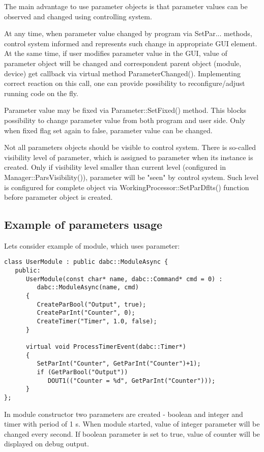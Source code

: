 The main advantage to use parameter objects is that parameter values can be 
observed and changed using controlling system.

At any time, when parameter value changed by program via SetPar... methods, 
control system informed and represents such change in appropriate GUI element.
At the same time, if user modifies parameter value in the GUI, value of parameter object
will be changed and correspondent parent object (module, device) get callback via 
virtual method ParameterChanged(). Implementing correct reaction on this call, 
one can provide possibility to reconfigure/adjust running code on the fly.

Parameter value may be fixed via Parameter::SetFixed() method. This blocks possibility 
to change parameter value from both program and user side. Only when fixed flag set again to false,
parameter value can be changed. 

Not all parameters objects should be visible to control system. There is so-called 
visibility level of parameter, which is assigned to parameter when its instance is created.
Only if visibility level smaller than current level (configured in Manager::ParsVisibility()),
parameter will be "seen" by control system. Such level is configured for complete object 
via WorkingProcessor::SetParDflts() function before parameter object is created.


\subsection{Example of parameters usage}

Lets consider example of module, which uses parameter:

\begin{verbatim}
class UserModule : public dabc::ModuleAsync {
   public:
      UserModule(const char* name, dabc::Command* cmd = 0) : 
         dabc::ModuleAsync(name, cmd)
      {
         CreateParBool("Output", true);
         CreateParInt("Counter", 0);
         CreateTimer("Timer", 1.0, false);
      }
      
      virtual void ProcessTimerEvent(dabc::Timer*)
      {
         SetParInt("Counter", GetParInt("Counter")+1);
         if (GetParBool("Output")) 
            DOUT1(("Counter = %d", GetParInt("Counter")));
      }
}; 
\end{verbatim}

In module constructor two parameters are created - boolean and integer and timer with period of 1 s.
When module started, value of integer parameter will be changed every second.
If boolean parameter is set to true, value of counter will be displayed on debug output.

